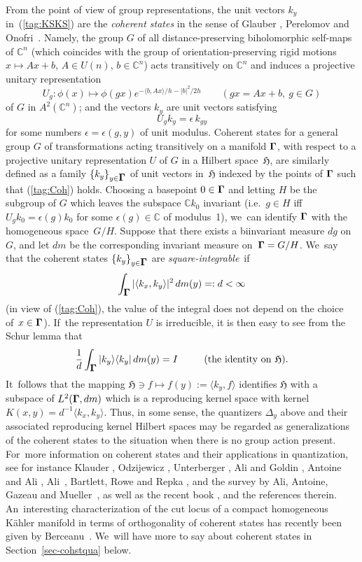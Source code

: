 \documentclass[11pt]{amsart}
\numberwithin{equation}{section}
\theoremstyle{remark}
\newcommand\spr[2]{\langle #1,#2\rangle}
\newcommand\into{\int_\Omg}
\newcommand\Omg{{\bigam}}   %
\newcommand\HH{\mathfrak H}
\newcommand{\CC}{\C}
\newcommand{\bigam}{\mbox{\boldmath $\Gamma$}}
\newcommand{\C}{\mathbb C}
\begin{document}
From the point of view of group representations, the unit vectors $k_y$
in~(\ref{tag:KSKS}) are the {\sl coherent states\/} in the sense of Glauber
\cite{bib:Glaub}, Perelomov \cite{bib:Perel} and Onofri~\cite{bib:Onof}.
Namely, the group $G$ of all distance-preserving biholomorphic self-maps of
$\CC^n$ (which coincides with the group of orientation-preserving rigid motions
$x\mapsto Ax+b$, $A\in U(n)$, $b\in\CC^n$) acts transitively on $\CC^n$ and
induces a projective unitary representation
$$ U_g: \phi(x) \mapsto \phi(gx) e^{-\spr b{Ax}/h-|b|^2/2h}
\qquad (gx=Ax+b, \  g\in G)  $$
of $G$ in $A^2(\CC^n)$; and the vectors $k_y$ are unit vectors satisfying
\begin{equation}  U_g k_y = \epsilon \, k_{gy}  \label{tag:Coh}  \end{equation}
for some numbers $\epsilon=\epsilon(g,y)$ of unit modulus. Coherent states for
a general group $G$ of transformations acting transitively on a manifold
$\Omg$, with respect to a projective unitary representation $U$ of $G$ in a
Hilbert space~$\HH$, are similarly defined as a family $\{k_y\}_{y\in \Omg}$ of
unit vectors in~$\HH$ indexed by the points of $\Omg$ such that (\ref{tag:Coh})
holds. Choosing a basepoint $0\in \Omg$ and letting $H$ be the subgroup of $G$
which leaves the subspace $\CC k_0$ invariant (i.e.~$g\in H$ iff $U_g
k_0=\epsilon(g) k_0$ for some $\epsilon(g)\in\CC$ of modulus~1), we~can
identify $\Omg$ with the homogeneous space~$G/H$. Suppose that there exists a
biinvariant measure $dg$ on~$G$, and let $dm$ be the corresponding invariant
measure on~$\Omg=G/H$. We~say that the coherent states $\{k_y\}_{y\in \Omg}$
are {\sl square-integrable\/}~if
$$ \into |\spr{k_x}{k_y}|^2 \, dm(y) =:d<\infty   $$
(in view of (\ref{tag:Coh}), the value of the integral does not depend on the
choice of~$x\in \Omg$). If~the representation $U$ is irreducible, it is then
easy to see from the Schur lemma that
$$ \frac1d \into \vert k_y \rangle\langle k_y\vert \, dm(y) = I
\qquad\text{(the identity on $\HH$).}  $$
It~follows that the mapping $\HH\ni f\mapsto f(y):= \spr {k_y}f$ identifies
$\HH$ with a subspace of $L^2(\Omg,dm)$ which is a reproducing kernel space
with kernel $K(x,y)= d^{-1} \spr{k_x}{k_y}$. Thus, in some sense, the
quantizers $\Delta_y$ above and their associated reproducing kernel Hilbert
spaces may be regarded as generalizations of the coherent states to the
situation when there is no group action present. For~more information on
coherent states and their applications in quantization, see for instance
Klauder \cite{bib:Klaud}, Odzijewicz \cite{bib:OdziB}, Unterberger
\cite{bib:UntCS}, Ali and Goldin \cite{bib:AliGo}, Antoine and Ali
\cite{bib:AAli}, Ali~\cite{bib:AliCS}, Bartlett, Rowe and Repka
\cite{bib:+Rowe}, and the survey by Ali, Antoine, Gazeau and
Mueller~\cite{bib:AAGM}, as well as the recent book \cite{bib:AAGbk}, and the
references therein. An~interesting characterization of the cut locus of a
compact homogeneous K\"ahler manifold in terms of orthogonality of coherent
states has recently been given by Berceanu~\cite{bib:Berc}. We~will have more
to say about coherent states in Section~\ref{sec-cohstqua} below.
\end{document}

